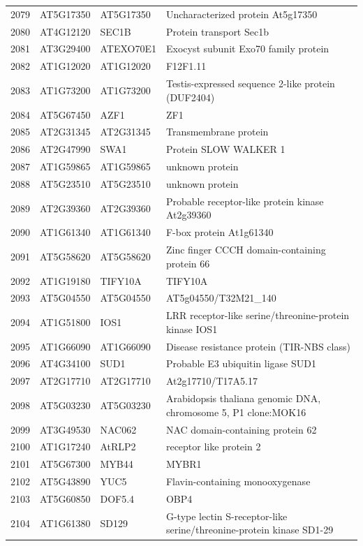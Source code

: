 \documentclass[11pt]{article}
\begin{document}
\begin{center}
\begin{tabular}{rlll}
2079 & AT5G17350 & AT5G17350 & Uncharacterized protein At5g17350\\
2080 & AT4G12120 & SEC1B & Protein transport Sec1b\\
2081 & AT3G29400 & ATEXO70E1 & Exocyst subunit Exo70 family protein\\
2082 & AT1G12020 & AT1G12020 & F12F1.11\\
2083 & AT1G73200 & AT1G73200 & Testis-expressed sequence 2-like protein (DUF2404)\\
2084 & AT5G67450 & AZF1 & ZF1\\
2085 & AT2G31345 & AT2G31345 & Transmembrane protein\\
2086 & AT2G47990 & SWA1 & Protein SLOW WALKER 1\\
2087 & AT1G59865 & AT1G59865 & unknown protein\\
2088 & AT5G23510 & AT5G23510 & unknown protein\\
2089 & AT2G39360 & AT2G39360 & Probable receptor-like protein kinase At2g39360\\
2090 & AT1G61340 & AT1G61340 & F-box protein At1g61340\\
2091 & AT5G58620 & AT5G58620 & Zinc finger CCCH domain-containing protein 66\\
2092 & AT1G19180 & TIFY10A & TIFY10A\\
2093 & AT5G04550 & AT5G04550 & AT5g04550/T32M21\_140\\
2094 & AT1G51800 & IOS1 & LRR receptor-like serine/threonine-protein kinase IOS1\\
2095 & AT1G66090 & AT1G66090 & Disease resistance protein (TIR-NBS class)\\
2096 & AT4G34100 & SUD1 & Probable E3 ubiquitin ligase SUD1\\
2097 & AT2G17710 & AT2G17710 & At2g17710/T17A5.17\\
2098 & AT5G03230 & AT5G03230 & Arabidopsis thaliana genomic DNA, chromosome 5, P1 clone:MOK16\\
2099 & AT3G49530 & NAC062 & NAC domain-containing protein 62\\
2100 & AT1G17240 & AtRLP2 & receptor like protein 2\\
2101 & AT5G67300 & MYB44 & MYBR1\\
2102 & AT5G43890 & YUC5 & Flavin-containing monooxygenase\\
2103 & AT5G60850 & DOF5.4 & OBP4\\
2104 & AT1G61380 & SD129 & G-type lectin S-receptor-like serine/threonine-protein kinase SD1-29\\

\end{tabular}
\end{center}
\end{document}
